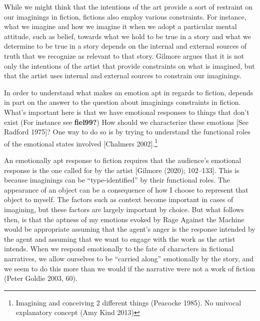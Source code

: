 \documentclass[12pt]{book}
\theoremstyle{definition}
\theoremstyle{remark}
\begin{document}
While we might think that the intentions of the art provide a sort of restraint on our imaginings in fiction, fictions also employ various constraints. For instance, what we imagine and how we imagine it when we adopt a particular mental attitude, such as belief, towards what we hold to be true in a story and what we determine to be true in a story depends on the internal and external sources of truth that we recognize as relevant to that story. Gilmore argues that it is not only the intentions of the artist that provide constraints on what is imagined, but that the artist uses internal and external sources to constrain our imaginings.

In order to understand what makes an emotion apt in regards to fiction, depends in part on the answer to the question about imaginings constraints in fiction. What's important here is that we have emotional responses to things that don't exist (For instance see \textbf{fiel99?}) How should we characterize these emotions {[}See Radford 1975{]}? One way to do so is by trying to understand the functional roles of the emotional states involved {[}Chalmers 2002{]}.\footnote{Imagining and conceiving 2 different things (Peacocke 1985). No univocal explanatory concept (Amy Kind 2013)}

An emotionally apt response to fiction requires that the audience's emotional response is the one called for by the artist {[}Gilmore (2020); 102--133{]}. This is because imaginings can be ``type-identified'' by their functional roles. The appearance of an object can be a consequence of how I choose to represent that object to myself. The factors such as context become important in cases of imagining, but these factors are largely important by choice. But what follows then, is that the aptness of my emotions evoked by Rage Against the Machine would be appropriate assuming that the agent's anger is the response intended by the agent and assuming that we want to engage with the work as the artist intends. When we respond emotionally to the fate of characters in fictional narratives, we allow ourselves to be ``carried along'' emotionally by the story, and we seem to do this more than we would if the narrative were not a work of fiction (Peter Goldie 2003, 60).
\end{document}
